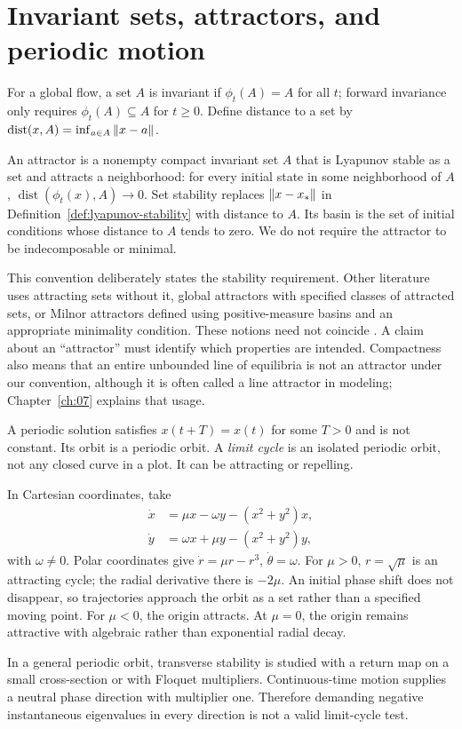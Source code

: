 \section{Invariant sets, attractors, and periodic motion}
For a global flow, a set $A$ is invariant if $\phi_t(A)=A$ for all $t$; forward invariance only requires $\phi_t(A)\subseteq A$ for $t\geq0$. Define distance to a set by $\operatorname{dist}(x,A)=\inf_{a\in A}\left\lVert x-a\right\rVert$.

\begin{definition}\label{def:attractor}
An attractor is a nonempty compact invariant set $A$ that is Lyapunov stable as a set and attracts a neighborhood: for every initial state in some neighborhood of $A$, $\operatorname{dist}(\phi_t(x),A)\to0$. Set stability replaces $\left\lVert x-x_*\right\rVert$ in Definition~\ref{def:lyapunov-stability} with distance to $A$. Its basin is the set of initial conditions whose distance to $A$ tends to zero. We do not require the attractor to be indecomposable or minimal.
\end{definition}
This convention deliberately states the stability requirement. Other literature uses attracting sets without it, global attractors with specified classes of attracted sets, or Milnor attractors defined using positive-measure basins and an appropriate minimality condition. These notions need not coincide \citep{milnor1985}. A claim about an ``attractor'' must identify which properties are intended. Compactness also means that an entire unbounded line of equilibria is not an attractor under our convention, although it is often called a line attractor in modeling; Chapter~\ref{ch:07} explains that usage.

A periodic solution satisfies $x(t+T)=x(t)$ for some $T>0$ and is not constant. Its orbit is a periodic orbit. A \emph{limit cycle} is an isolated periodic orbit, not any closed curve in a plot. It can be attracting or repelling.

\begin{example}\label{ex:hopf-normal}
In Cartesian coordinates, take
\begin{align}
\dot x&=\mu x-\omega y-(x^2+y^2)x,\\
\dot y&=\omega x+\mu y-(x^2+y^2)y,
\end{align}
with $\omega\ne0$. Polar coordinates give $\dot r=\mu r-r^3$, $\dot\theta=\omega$. For $\mu>0$, $r=\sqrt\mu$ is an attracting cycle; the radial derivative there is $-2\mu$. An initial phase shift does not disappear, so trajectories approach the orbit as a set rather than a specified moving point. For $\mu<0$, the origin attracts. At $\mu=0$, the origin remains attractive with algebraic rather than exponential radial decay.
\end{example}
In a general periodic orbit, transverse stability is studied with a return map on a small cross-section or with Floquet multipliers. Continuous-time motion supplies a neutral phase direction with multiplier one. Therefore demanding negative instantaneous eigenvalues in every direction is not a valid limit-cycle test.

